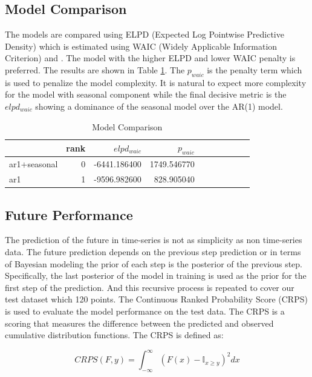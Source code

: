 \documentclass{IEEEtran}
\begin{document}
  \subsection{Model Comparison}
  The models are compared using  ELPD (Expected Log Pointwise Predictive Density) which is estimated using WAIC (Widely Applicable Information Criterion) \cite{waic} and \cite{EPLD}. The model with the higher ELPD and lower WAIC penalty is preferred. The results are shown in Table \ref{tab:model_comparison}. The $p_{waic}$ is the penalty term which is used to penalize the model complexity. It is natural to expect more complexity for the model with seasonal component while the final decisive metric is the $elpd_{waic}$ showing a dominance of the seasonal model over the AR(1) model.
  \begin{table}[ht!]
    \caption{Model Comparison}\label{tab:model_comparison}
    \begin{center}
      \begin{tabular}{lrrrrrrrrl}
      \toprule
       & rank & $elpd_{waic}$ & $p_{waic}$ \\
      \midrule
      ar1+seasonal & 0 & -6441.186400 & 1749.546770 \\
      ar1 & 1 & -9596.982600 & 828.905040 \\
      \bottomrule
      \end{tabular} 
    \end{center}
  \end{table}

  \subsection{Future Performance}
  The prediction of the future in time-series is not as simplicity as non time-series data. The future prediction depends on the previous step prediction or in terms of Bayesian modeling the prior of each step is the posterior of the previous step. Specifically, the last posterior of the model in training is used as the prior for the first step of the prediction. And this recursive process is repeated to cover our test dataset which 120 points. 
The Continuous Ranked Probability Score (CRPS) is used to evaluate the model performance on the test data. The CRPS is a scoring that measures the difference between the predicted and observed cumulative distribution functions. The CRPS is defined as:

\[
  CRPS(F, y) = \int_{-\infty}^{\infty} (F(x) - \mathbb{I}_{x\ge y})^2 dx
\]
\end{document}
